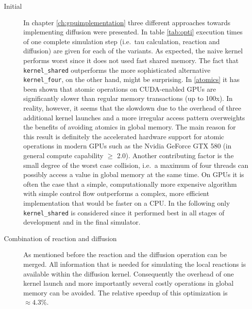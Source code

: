 \begin{description}
\item[Initial] In chapter \ref{ch:gpuimplementation} three different approaches towards implementing diffusion were presented. In table \ref{tab:opti} execution times of one complete simulation step (i.e.\ tau calculation, reaction and diffusion) are given for each of the variants. As expected, the naive kernel performs worst since it does not used fast shared memory. The fact that \texttt{kernel\_shared} outperforms the more sophisticated alternative \texttt{kernel\_four}, on the other hand, might be surprising. In \ref{atomics} it has been shown that atomic operations on CUDA-enabled GPUs are significantly slower than regular memory transactions (up to 100x). In reality, however, it seems that the slowdown due to the overhead of three additional kernel launches and a more irregular access pattern overweights the benefits of avoiding atomics in global memory. The main reason for this result is definitely the accelerated hardware support for atomic operations in modern GPUs such as the Nvidia GeForce GTX 580 (in general compute capability $\geq$ 2.0). Another contributing factor is the small degree of the worst case collision, i.e.\ a maximum of four threads can possibly access a value in global memory at the same time. On GPUs it is often the case that a simple, computationally more expensive algorithm with simple control flow outperforms a complex, more efficient implementation that would be faster on a CPU. In the following only \texttt{kernel\_shared} is considered since it performed best in all stages of development and in the final simulator. 
\item[Combination of reaction and diffusion] As mentioned before the reaction and the diffusion operation can be merged. All information that is needed for simulating the local reactions is available within the diffusion kernel. Consequently the overhead of one kernel launch and more importantly several costly operations in global memory can be avoided. The relative speedup of this optimization is $\approx 4.3\%$. 

\end{description}
